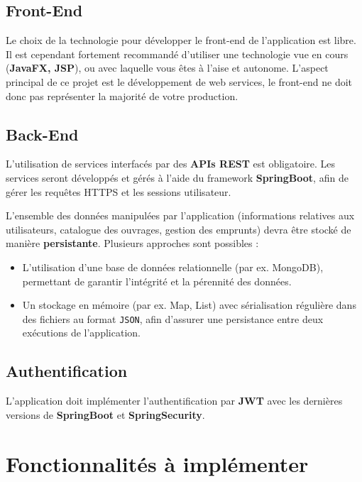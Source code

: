 \documentclass{article}%
\begin{document}
\subsection{Front-End}

Le choix de la technologie pour développer le front-end de l'application est libre. Il est cependant fortement recommandé d'utiliser une technologie vue en cours (\textbf{JavaFX, JSP}), ou avec laquelle vous êtes à l'aise et autonome. L'aspect principal de ce projet est le développement de web services, le front-end ne doit donc pas représenter la majorité de votre production.

\subsection{Back-End}

L'utilisation de services interfacés par des \textbf{APIs REST} est obligatoire. Les services seront développés et gérés à l'aide du framework \textbf{SpringBoot}, afin de gérer les requêtes HTTPS et les sessions utilisateur.

L'ensemble des données manipulées par l'application (informations relatives aux utilisateurs, catalogue des ouvrages, gestion des emprunts) devra être stocké de manière \textbf{persistante}. Plusieurs approches sont possibles :  
\begin{itemize}
    \item L'utilisation d'une base de données relationnelle (par ex. MongoDB), permettant de garantir l'intégrité et la pérennité des données.  
    \item Un stockage en mémoire (par ex. Map, List) avec sérialisation régulière dans des fichiers au format \texttt{JSON}, afin d'assurer une persistance entre deux exécutions de l'application.  
\end{itemize}

\subsection{Authentification}

L'application doit implémenter l'authentification par \textbf{JWT} avec les dernières versions de \textbf{SpringBoot} et \textbf{SpringSecurity}.

\section{Fonctionnalités à implémenter}
\end{document}
